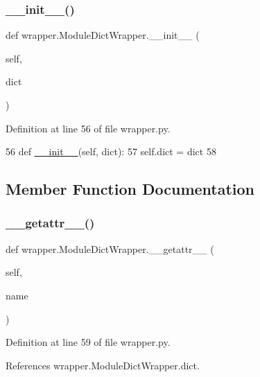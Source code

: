 \subsubsection{\texorpdfstring{\+\_\+\+\_\+init\+\_\+\+\_\+()}{\_\_init\_\_()}}
{\footnotesize\ttfamily def wrapper.\+Module\+Dict\+Wrapper.\+\_\+\+\_\+init\+\_\+\+\_\+ (\begin{DoxyParamCaption}\item[{}]{self,  }\item[{}]{dict }\end{DoxyParamCaption})}



Definition at line 56 of file wrapper.\+py.


\begin{DoxyCode}
56     \textcolor{keyword}{def }\hyperlink{classwrapper_1_1ModuleDictWrapper_a9a7a794150502f51df687831583e13b9}{\_\_init\_\_}(self, dict):
57         self.dict = dict
58 
\end{DoxyCode}


\subsection{Member Function Documentation}
\mbox{\label{classwrapper_1_1ModuleDictWrapper_adae96be13e70d38f587247c42a1a69a4}} 
\subsubsection{\texorpdfstring{\+\_\+\+\_\+getattr\+\_\+\+\_\+()}{\_\_getattr\_\_()}}
{\footnotesize\ttfamily def wrapper.\+Module\+Dict\+Wrapper.\+\_\+\+\_\+getattr\+\_\+\+\_\+ (\begin{DoxyParamCaption}\item[{}]{self,  }\item[{}]{name }\end{DoxyParamCaption})}



Definition at line 59 of file wrapper.\+py.



References wrapper.\+Module\+Dict\+Wrapper.\+dict.


